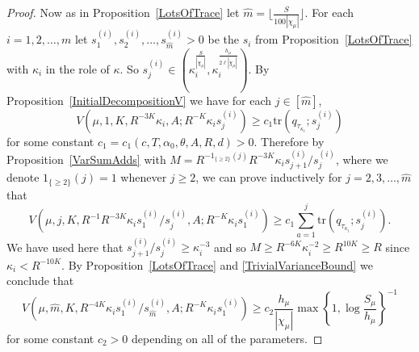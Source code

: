 \documentclass[10pt, english,oneside,reqno]{amsart}
\theoremstyle{plain}
\theoremstyle{remark}
\numberwithin{equation}{section}
\numberwithin{figure}{section}
\begin{document}
\begin{proof}
    Now as in Proposition~\ref{LotsOfTrace} let $\hat{m} = \lfloor \frac{S}{100 |\chi_{\mu}|} \rfloor$. For each $i = 1, 2, \dots, m$ let $s_1^{(i)}, s_2^{(i)}, \dots, s_{\hat{m}}^{(i)} > 0$ be the $s_i$ from Proposition~\ref{LotsOfTrace} with $\kappa_i$ in the role of $\kappa$. So $s_j^{(i)} \in (\kappa_i^{\frac{S}{|\chi_{\mu}|}}, \kappa_i^{\frac{h_{\mu}}{2\ell|\chi_{\mu}|}} )$. By Proposition~\ref{InitialDecompositionV} we have for each $j \in [\hat{m}]$,
    \begin{equation*}
        V(\mu,1,K,R^{-3K} \kappa_i, A; R^{-K} \kappa_i s_j^{(i)}) \geq c_1 \mathrm{tr}(q_{\tau_{\kappa_i}}; s_j^{(i)}) 
    \end{equation*}
    for some constant $c_1 = c_1(c, T, \alpha_0, \theta, A, R, d) > 0$. Therefore by Proposition~\ref{VarSumAdds} with $M= R^{-1_{\{ \geq 2 \}}(j)} R^{-3K} \kappa_i s_{j+1}^{(i)} / {s_{j}^{(i)}}$, where we denote $1_{\{ \geq 2 \}}(j) = 1$ whenever $j \geq 2$, we can prove inductively for $j=2, 3, \dots, \hat{m}$ that
    \begin{equation*}
        V(\mu,j,K, R^{-1} R^{-3K} \kappa_i s_1^{(i)} /  s_j^{(i)} , A; R^{-K} \kappa_i s_1^{(i)}) \geq c_1 \sum_{a = 1}^{j} \mathrm{tr}(q_{\tau_{\kappa_i}}; s_j^{(i)}).
    \end{equation*} We have used here that $s_{j + 1}^{(i)}/s_{j}^{(i)} \geq \kappa_i^{-3}$ and so $M \geq R^{-6K}\kappa_i^{-2} \geq R^{10K} \geq R$ since $\kappa_i < R^{-10K}$. By Proposition~\ref{LotsOfTrace} and \eqref{TrivialVarianceBound} we conclude that
    \begin{equation*}
        V(\mu,\hat{m},K, R^{-4K} \kappa_i s_1^{(i)}/ s_{\hat{m}}^{(i)} , A; R^{-K}\kappa_i s_{1}^{(i)}) \geq c_2 \frac{h_{\mu}}{|\chi_{\mu}|} \max \left\{1, \log \frac{S_{\mu}}{h_{\mu}} \right\}^{-1}
    \end{equation*}
    for some constant $c_2> 0$ depending on all of the parameters. 
    

\end{proof}
\end{document}
